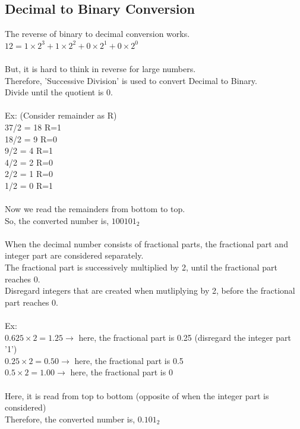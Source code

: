 \documentclass{article}
\begin{document}
\subsection*{Decimal to Binary Conversion}
The reverse of binary to decimal conversion works.\\
$12 = 1 \times 2^3 + 1 \times 2^2 + 0 \times 2^1 + 0 \times 2^0$\\
\\
But, it is hard to think in reverse for large numbers.\\
Therefore, 'Successive Division' is used to convert Decimal to Binary.\\
Divide until the quotient is 0.\\
\\
Ex: (Consider remainder as R)\\
37/2 = 18 R=1\\
18/2 = 9 R=0\\
9/2 = 4 R=1\\
4/2 = 2 R=0\\
2/2 = 1 R=0\\
1/2 = 0 R=1\\\\
Now we read the remainders from bottom to top.\\
So, the converted number is, $100101_2$\\
\\When the decimal number consists of fractional parts, the fractional part and integer part are considered separately.\\
The fractional part is successively multiplied by 2, until the fractional part reaches 0.\\
Disregard integers that are created when mutliplying by 2, before the fractional part reaches 0.\\
\\
Ex:\\
$0.625 \times 2 = 1.25 \rightarrow$ here, the fractional part is 0.25 (disregard the integer part '1')\\
$0.25 \times 2 = 0.50 \rightarrow$ here, the fractional part is 0.5\\
$0.5 \times 2 = 1.00 \rightarrow$ here, the fractional part is 0\\
\\
Here, it is read from top to bottom (opposite of when the integer part is considered)\\
Therefore, the converted number is, $0.101_2$
\end{document}
